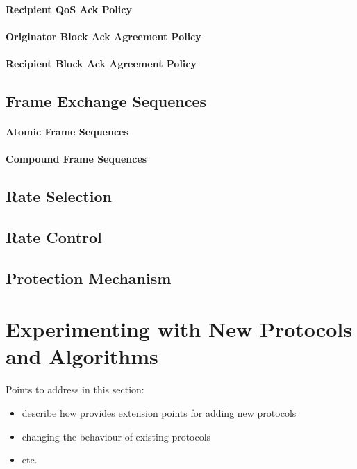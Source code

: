 %
\paragraph{Recipient QoS Ack Policy}
%

%
\paragraph{Originator Block Ack Agreement Policy}
%

%
\paragraph{Recipient Block Ack Agreement Policy}
%

\subsection{Frame Exchange Sequences}
\label{subsec:ieee-802.11-frame-sequences}
%

%
\paragraph{Atomic Frame Sequences}
%

%
\paragraph{Compound Frame Sequences}
%

\subsection{Rate Selection}
\label{subsec:ieee-802.11-rate-selection}
%

\subsection{Rate Control}
\label{subsec:ieee-802.11-rate-control}
%

\subsection{Protection Mechanism}
\label{subsec:ieee-802.11-protection-mechanism}
%

%
\section{Experimenting with New Protocols and Algorithms}
\label{sec:experimentation}
%
Points to address in this section:
\begin{itemize}
	\item	describe how \inet provides extension points for adding new protocols
	\item	changing the behaviour of existing protocols
	\item	etc.
\end{itemize}

